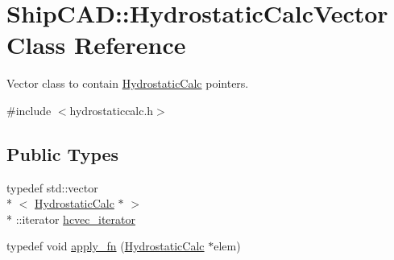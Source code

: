 \hypertarget{classShipCAD_1_1HydrostaticCalcVector}{\section{Ship\-C\-A\-D\-:\-:Hydrostatic\-Calc\-Vector Class Reference}
\label{classShipCAD_1_1HydrostaticCalcVector}
}


Vector class to contain \hyperlink{classShipCAD_1_1HydrostaticCalc}{Hydrostatic\-Calc} pointers.  




{\ttfamily \#include $<$hydrostaticcalc.\-h$>$}

\subsection*{Public Types}
\begin{DoxyCompactItemize}
\item 
typedef std\-::vector\\*
$<$ \hyperlink{classShipCAD_1_1HydrostaticCalc}{Hydrostatic\-Calc} $\ast$ $>$\\*
\-::iterator \hyperlink{classShipCAD_1_1HydrostaticCalcVector_aecdea2f034955ae53b4d0855332491e5}{hcvec\-\_\-iterator}
\item 
typedef void \hyperlink{classShipCAD_1_1HydrostaticCalcVector_aba4bf648866d2fee843a3b1f3b366522}{apply\-\_\-fn} (\hyperlink{classShipCAD_1_1HydrostaticCalc}{Hydrostatic\-Calc} $\ast$elem)
\end{DoxyCompactItemize}
